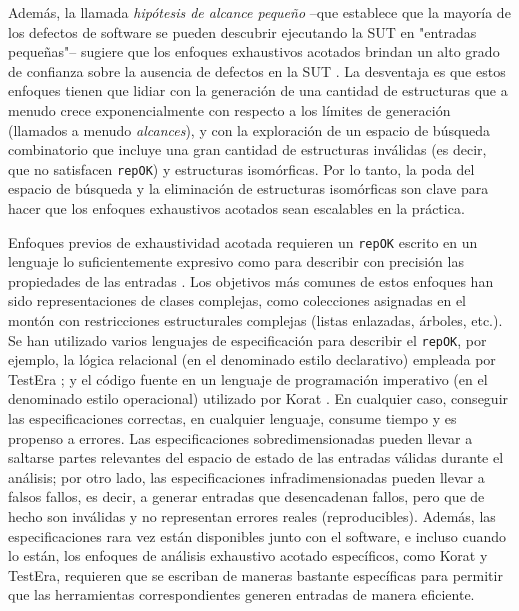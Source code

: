
Además, la llamada \emph{hipótesis de alcance pequeño} --que establece que la mayoría de los defectos de software se pueden descubrir ejecutando la SUT en "entradas pequeñas"-- sugiere que los enfoques exhaustivos acotados brindan un alto grado de confianza sobre la ausencia de defectos en la SUT \cite{Andoni02}. La desventaja es que estos enfoques tienen que lidiar con la generación de una cantidad de estructuras que a menudo crece exponencialmente con respecto a los límites de generación (llamados a menudo \emph{alcances}), y con la exploración de un espacio de búsqueda combinatorio que incluye una gran cantidad de estructuras inválidas (es decir, que no satisfacen \texttt{repOK}) y estructuras isomórficas. Por lo tanto, la poda del espacio de búsqueda y la eliminación de estructuras isomórficas son clave para hacer que los enfoques exhaustivos acotados sean escalables en la práctica.

Enfoques previos de exhaustividad acotada requieren un \texttt{repOK} escrito en un lenguaje lo suficientemente expresivo como para describir con precisión las propiedades de las entradas \cite{Marinov01, Boyapati02}. Los objetivos más comunes de estos enfoques han sido representaciones de clases complejas, como colecciones asignadas en el montón con restricciones estructurales complejas (listas enlazadas, árboles, etc.). Se han utilizado varios lenguajes de especificación para describir el \texttt{repOK}, por ejemplo, la lógica relacional (en el denominado estilo declarativo) empleada por \textsf{TestEra} \cite{Marinov01}; y el código fuente en un lenguaje de programación imperativo (en el denominado estilo operacional) utilizado por \textsf{Korat} \cite{Boyapati02}. En cualquier caso, conseguir las especificaciones correctas, en cualquier lenguaje, consume tiempo y es propenso a errores. Las especificaciones sobredimensionadas pueden llevar a saltarse partes relevantes del espacio de estado de las entradas válidas durante el análisis; por otro lado, las especificaciones infradimensionadas pueden llevar a falsos fallos, es decir, a generar entradas que desencadenan fallos, pero que de hecho son inválidas y no representan errores reales (reproducibles). Además, las especificaciones rara vez están disponibles junto con el software, e incluso cuando lo están, los enfoques de análisis exhaustivo acotado específicos, como \textsf{Korat} y \textsf{TestEra}, requieren que se escriban de maneras bastante específicas para permitir que las herramientas correspondientes generen entradas de manera eficiente.



